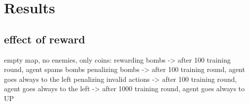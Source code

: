 \section{Results}

\subsection{effect of reward}

empty map, no enemies, only coins:
rewarding bombs -> after 100 training round, agent spams bombs 
penalizing bombs -> after 100 training round, agent goes always to the left 
penalizing invalid actions -> after 100 training round, agent goes always to the left 
-> after 1000 training round, agent goes always to UP
